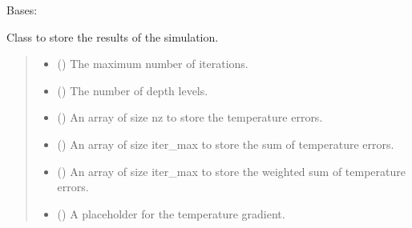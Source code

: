\documentclass[a4paper,11pt,english,openany]{sphinxmanual}
\begin{document}
\begin{fulllineitems}
\label{\detokenize{api/spyice.parameters.results_params:src.spyice.parameters.results_params.ResultsParams}}
\pysigstartsignatures
\pysigline
{}
\pysigstopsignatures
\sphinxAtStartPar
Bases: 

\sphinxAtStartPar
Class to store the results of the simulation.
\begin{quote}\begin{description}
\begin{itemize}
\item {} 
\sphinxAtStartPar
{} () \textendash{} The maximum number of iterations.

\item {} 
\sphinxAtStartPar
{} () \textendash{} The number of depth levels.

\end{itemize}

\begin{itemize}
\item {} 
\sphinxAtStartPar
{} () \textendash{} An array of size nz to store the temperature errors.

\item {} 
\sphinxAtStartPar
{} () \textendash{} An array of size iter\_max to store the sum of temperature errors.

\item {} 
\sphinxAtStartPar
{} () \textendash{} An array of size iter\_max to store the weighted sum of temperature errors.

\item {} 
\sphinxAtStartPar
{} () \textendash{} A placeholder for the temperature gradient.


\end{itemize}
\end{description}
\end{quote}
\end{fulllineitems}
\end{document}
